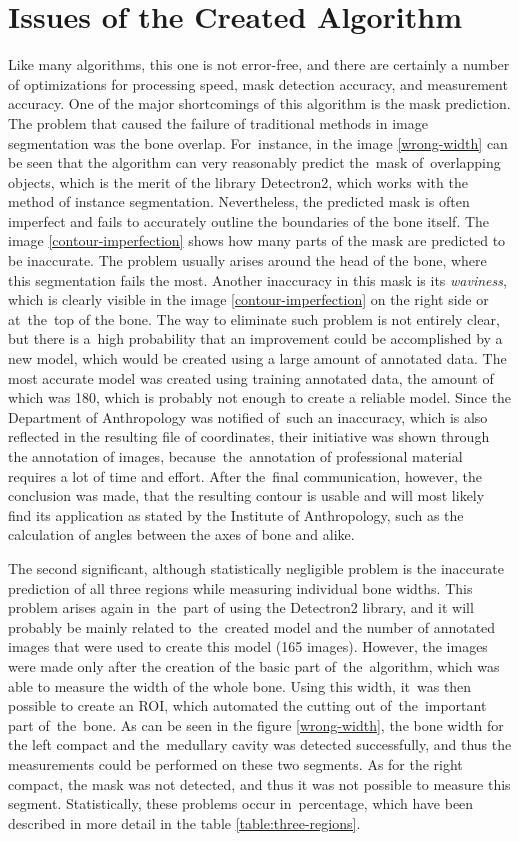 \section{Issues of the Created Algorithm}
Like many algorithms, this one is not error-free, and there are certainly a number of optimizations for processing speed, mask detection accuracy, and measurement accuracy. One of the major shortcomings of this algorithm is the mask prediction. The problem that caused the failure of traditional methods in image segmentation was the bone overlap. For~instance, in the image \ref{wrong-width} can be seen that the algorithm can very reasonably predict the~mask of~overlapping objects, which is the merit of the library Detectron2, which works with the method of instance segmentation. Nevertheless, the predicted mask is often imperfect and fails to accurately outline the boundaries of the bone itself. The image  \ref{contour-imperfection} shows how many parts of the mask are predicted to be inaccurate. The problem usually arises around the head of the bone, where this segmentation fails the most. Another inaccuracy in this mask is its \textit{waviness}, which is clearly visible in the image \ref{contour-imperfection} on the right side or at~the~top of the bone. The way to eliminate such problem is not entirely clear, but there is a~high probability that an improvement could be accomplished by a new model, which would be created using a large amount of annotated data. The most accurate model was created using training annotated data, the amount of which was 180, which is probably not enough to create a reliable model. Since the Department of Anthropology was notified of~such an inaccuracy, which is also reflected in the resulting file of coordinates, their initiative was shown through the annotation of images, because~the~annotation of professional material requires a lot of time and effort. After the~final communication, however, the conclusion was made, that the resulting contour is usable and will most likely find its application as stated by the Institute of Anthropology, such as the calculation of angles between the axes of bone and alike.

The second significant, although statistically negligible problem is the inaccurate prediction of all three regions while measuring individual bone widths. This problem arises again in~the~part of using the Detectron2 library, and it will probably be mainly related to~the~created model and the number of annotated images that were used to create this model (165 images). However, the images were made only after the creation of the basic part of~the~algorithm, which was able to measure the width of the whole bone. Using this width, it~was then possible to create an ROI, which automated the cutting out of~the~important part of~the~bone. As can be seen in the figure \ref{wrong-width}, the bone width for the left compact and the~medullary cavity was detected successfully, and thus the measurements could be performed on these two segments. As for the right compact, the mask was not detected, and thus it was not possible to measure this segment. Statistically, these problems occur in~percentage, which have been described in more detail in the table \ref{table:three-regions}.

